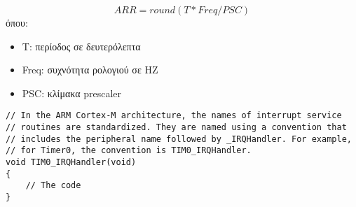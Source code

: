 \documentclass[11pt]{article}
\begin{document}
\begin{equation}
\label{eq:1}
ARR = round(T*Freq/PSC)
\end{equation}
όπου:
\begin{itemize}
\item T: περίοδος σε δευτερόλεπτα
\item Freq: συχνότητα ρολογιού σε HZ
\item PSC: κλίμακα prescaler
\end{itemize}

\begin{verbatim}
// In the ARM Cortex-M architecture, the names of interrupt service
// routines are standardized. They are named using a convention that
// includes the peripheral name followed by _IRQHandler. For example,
// for Timer0, the convention is TIM0_IRQHandler.
void TIM0_IRQHandler(void)
{
    // The code
}
\end{verbatim}
\end{document}

